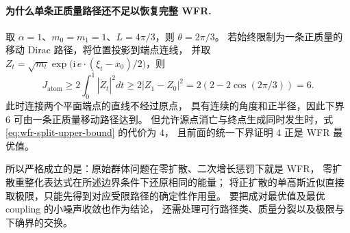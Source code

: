 \documentclass[UTF8,a4paper,11pt,fontset=fandol]{ctexart}
\begin{document}
\paragraph{为什么单条正质量路径还不足以恢复完整 WFR.}
取 $\alpha=1$、$m_0=m_1=1$、$L=4\pi/3$，则 $\theta=2\pi/3$。
若始终限制为一条正质量的移动 Dirac 路径，将位置投影到端点连线，
并取 $Z_t=\sqrt{m_t}\exp\!\bigl(\mathrm i\,e\cdot(\xi_t-x_0)/2\bigr)$，则
\begin{equation}
J_{\mathrm{atom}}\ge2\int_0^1|\dot Z_t|^2dt
\ge2|Z_1-Z_0|^2
=2(2-2\cos(2\pi/3))=6.
\end{equation}
此时连接两个平面端点的直线不经过原点，
具有连续的角度和正半径，因此下界 $6$ 可由一条正质量移动路径达到。
但允许源点消亡与终点生成同时发生时，式 \eqref{eq:wfr-split-upper-bound} 的代价为 $4$，
且前面的统一下界证明 $4$ 正是 WFR 最优值。

所以严格成立的是：原始群体问题在零扩散、二次增长惩罚下就是 WFR，
零扩散重整化表达式在所述边界条件下还原相同的能量；
将正扩散的单高斯近似直接取极限，只能先得到对应受限路径的确定性作用量。
要把成对最优值及最优 coupling 的小噪声收敛也作为结论，
还需处理可行路径类、质量分裂以及极限与下确界的交换。
\end{document}
